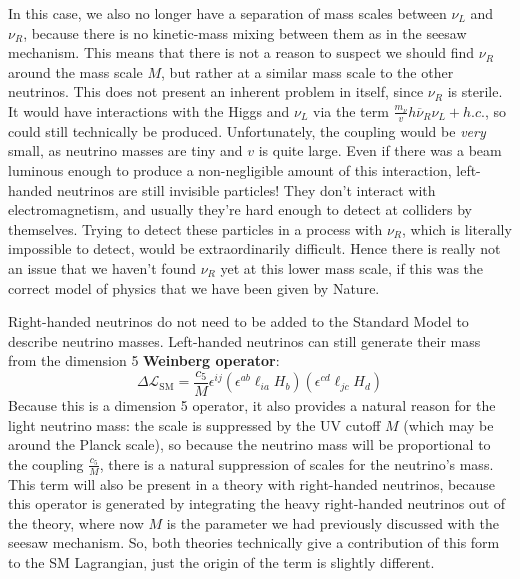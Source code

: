 \documentclass[11pt, oneside]{article}   	%
\theoremstyle{definition}
\numberwithin{equation}{subsection}		%
\begin{document}
In this case, we also no longer have a separation of mass scales between $\nu_L$ and $\nu_R$, because there is no kinetic-mass 
mixing between them as in the seesaw mechanism. This means that there is not a reason to suspect we should find $\nu_R$ 
around the mass scale $M$, but rather at a similar mass scale to the other neutrinos. This does not present an inherent problem 
in itself, since $\nu_R$ is sterile. It would have interactions with the Higgs and $\nu_L$ via the term $\frac{m_\nu}{v} h\overline\nu_R \nu_L 
+ h.c.$, so could still technically be produced. Unfortunately, the coupling would be \textit{very} small, as neutrino masses are 
tiny and $v$ is quite large. Even if there was a beam luminous enough to produce a non-negligible amount of this interaction, 
left-handed neutrinos are still invisible particles! They don't interact with electromagnetism, and usually they're hard enough to 
detect at colliders by themselves. Trying to detect these particles in a process with $\nu_R$, which is literally impossible to detect, 
would be extraordinarily difficult. Hence there is really not an issue that we haven't found $\nu_R$ yet at this lower mass scale, if 
this was the correct model of physics that we have been given by Nature. 

Right-handed neutrinos do not need to be added to the Standard Model to describe neutrino masses. Left-handed neutrinos can 
still generate their mass from the dimension 5 \textbf{Weinberg operator}:
\begin{equation}
	\Delta\mathcal L_\mathrm{SM} = \frac{c_5}{M} \epsilon^{ij}(\epsilon^{ab} \ell_{ia} H_b) (\epsilon^{cd} \ell_{jc} H_d)
\end{equation}
Because this is a dimension 5 operator, it also provides a natural reason for the light neutrino mass: the scale is suppressed by the UV 
cutoff $M$ (which may be around the Planck scale), so because the neutrino mass will be proportional to the coupling $\frac{c_5}{M}$, 
there is a natural suppression of scales for the neutrino's mass. 
This term will also be present in a theory with right-handed neutrinos, because this operator is generated by integrating the 
heavy right-handed neutrinos out of the theory, where now $M$ is the parameter we had previously discussed with the 
seesaw mechanism. So, both theories technically give a contribution of this form to the 
SM Lagrangian, just the origin of the term is slightly different. 
\end{document}
